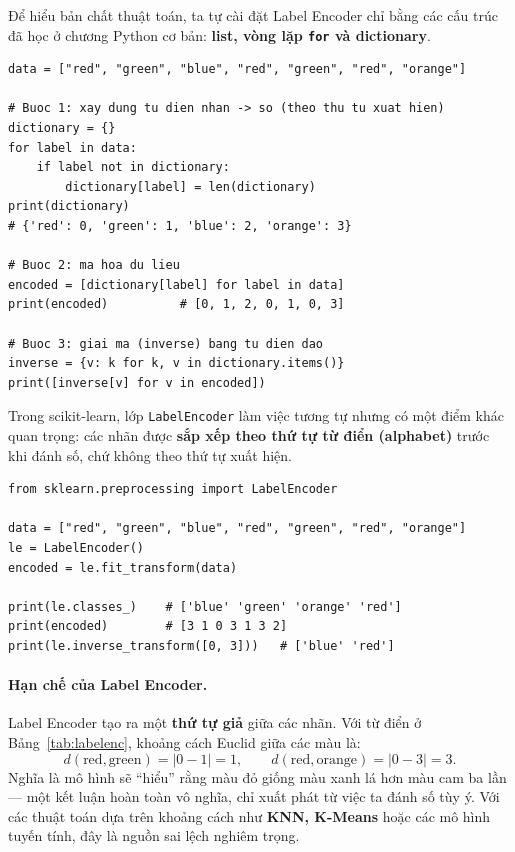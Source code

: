 Để hiểu bản chất thuật toán, ta tự cài đặt Label Encoder chỉ bằng các cấu trúc đã học ở chương Python cơ bản: \textbf{list, vòng lặp \texttt{for} và dictionary}.

\begin{lstlisting}[caption={Tự cài đặt Label Encoder bằng list, for và dictionary}]
data = ["red", "green", "blue", "red", "green", "red", "orange"]

# Buoc 1: xay dung tu dien nhan -> so (theo thu tu xuat hien)
dictionary = {}
for label in data:
    if label not in dictionary:
        dictionary[label] = len(dictionary)
print(dictionary)
# {'red': 0, 'green': 1, 'blue': 2, 'orange': 3}

# Buoc 2: ma hoa du lieu
encoded = [dictionary[label] for label in data]
print(encoded)          # [0, 1, 2, 0, 1, 0, 3]

# Buoc 3: giai ma (inverse) bang tu dien dao
inverse = {v: k for k, v in dictionary.items()}
print([inverse[v] for v in encoded])
\end{lstlisting}

Trong scikit-learn, lớp \texttt{LabelEncoder} làm việc tương tự nhưng có một điểm khác quan trọng: các nhãn được \textbf{sắp xếp theo thứ tự từ điển (alphabet)} trước khi đánh số, chứ không theo thứ tự xuất hiện.

\begin{lstlisting}[caption={Label Encoder với scikit-learn}]
from sklearn.preprocessing import LabelEncoder

data = ["red", "green", "blue", "red", "green", "red", "orange"]
le = LabelEncoder()
encoded = le.fit_transform(data)

print(le.classes_)    # ['blue' 'green' 'orange' 'red']
print(encoded)        # [3 1 0 3 1 3 2]
print(le.inverse_transform([0, 3]))   # ['blue' 'red']
\end{lstlisting}

\paragraph{Hạn chế của Label Encoder.} Label Encoder tạo ra một \textbf{thứ tự giả} giữa các nhãn. Với từ điển ở Bảng~\ref{tab:labelenc}, khoảng cách Euclid giữa các màu là:
\begin{equation}
    d(\text{red}, \text{green}) = |0 - 1| = 1, \qquad d(\text{red}, \text{orange}) = |0 - 3| = 3 .
\end{equation}
Nghĩa là mô hình sẽ ``hiểu'' rằng màu đỏ giống màu xanh lá hơn màu cam ba lần --- một kết luận hoàn toàn vô nghĩa, chỉ xuất phát từ việc ta đánh số tùy ý. Với các thuật toán dựa trên khoảng cách như \textbf{KNN, K-Means} hoặc các mô hình tuyến tính, đây là nguồn sai lệch nghiêm trọng.

